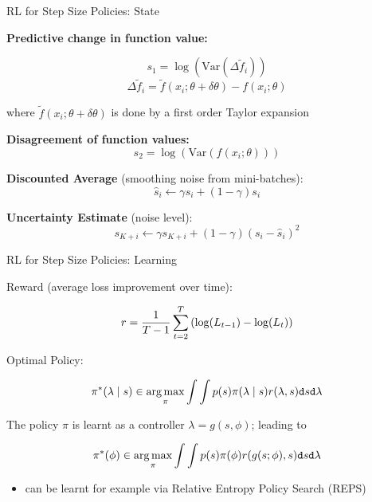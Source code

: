 \begin{frame}[c]{RL for Step Size Policies: State }

\textbf{Predictive change in function value:}

$$s_1 = \log \left( \text{Var}(\Delta \tilde{f}_i ) \right)$$
$$\Delta \tilde{f}_i = \tilde{f}(x_i; \theta + \delta \theta) - f(x_i; \theta)$$

where $\tilde{f}(x_i; \theta + \delta \theta)$ is done by a first order Taylor expansion

\pause
\textbf{Disagreement of function values:}
$$ s_2 = \log \left(\text{Var}(f(x_i; \theta)) \right)$$

\pause

\textbf{Discounted Average} (smoothing noise from mini-batches):
$$\hat{s}_i \leftarrow \gamma \hat{s_i} + (1 - \gamma) s_i$$

\pause

\textbf{Uncertainty Estimate} (noise level):
$$s_{K+i} \leftarrow \gamma s_{K+i} + (1-\gamma) (s_i - \hat{s}_i)^2$$


\end{frame}
\begin{frame}[c]{RL for Step Size Policies: Learning }

Reward (average loss improvement over time):

$$r = \frac{1}{T-1} \sum_{t=2}^T \left(\log(L_{t-1}) - \log(L_t)\right)$$

\pause

Optimal Policy:

$$\pi^*(\lambda \mid s) \in \operatorname*{arg\,max}_{\pi} \int \int p(s) \pi(\lambda\mid s)r(\lambda,s) \texttt{d}s \texttt{d}\lambda $$

\pause

The policy $\pi$ is learnt as a controller $\lambda = g(s, \phi)$; leading to

$$\pi^*(\phi) \in \operatorname*{arg\,max}_{\pi} \int \int p(s) \pi(\phi)r(g(s;\phi),s) \texttt{d}s \texttt{d}\lambda $$

\pause

\begin{itemize}
\item can be learnt for example via Relative Entropy Policy Search (REPS) 
\end{itemize}

\end{frame}
